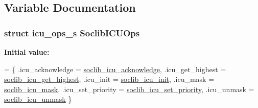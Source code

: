 \subsection{Variable Documentation}
\hypertarget{irq_2soclib-icu_8c_a57148fb85883dc5ca0480a7b55398c58}{
\subsubsection[{Soclib\-I\-C\-U\-Ops}]{\setlength{\rightskip}{0pt plus 5cm}struct {\bf icu\-\_\-ops\-\_\-s} Soclib\-I\-C\-U\-Ops}}\label{irq_2soclib-icu_8c_a57148fb85883dc5ca0480a7b55398c58}
{\bfseries Initial value\-:}
\begin{DoxyCode}
= \{
    .icu\_acknowledge = \hyperlink{irq_2soclib-icu_8c_a924a53d9cd3a4685a608fe6ec5efdca8}{soclib\_icu\_acknowledge},
    .icu\_get\_highest = \hyperlink{irq_2soclib-icu_8c_a31bf159c6e02e1717177273e6a74d374}{soclib\_icu\_get\_highest},
    .icu\_init = \hyperlink{irq_2soclib-icu_8c_a291831fe78dd1a558504a84a5685199b}{soclib\_icu\_init},
    .icu\_mask = \hyperlink{irq_2soclib-icu_8c_a97854aad88a8ec5625b03d30cc0246e4}{soclib\_icu\_mask},
    .icu\_set\_priority = \hyperlink{irq_2soclib-icu_8c_a29d2109ae12995fb60a2a9f278281e4f}{soclib\_icu\_set\_priority},
    .icu\_unmask = \hyperlink{irq_2soclib-icu_8c_a7fcbcc6fb620f7a6ed3082b7053ce0e1}{soclib\_icu\_unmask}
\}
\end{DoxyCode}
